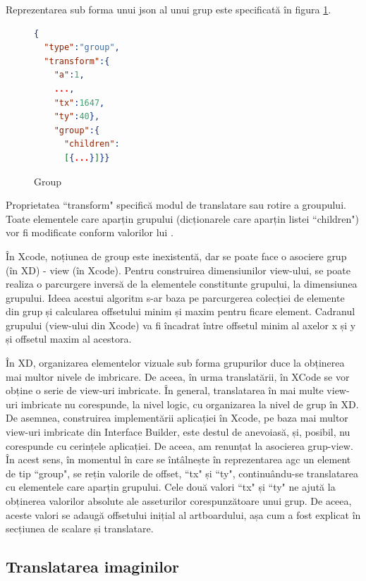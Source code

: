 Reprezentarea sub forma unui json al unui grup este specificată în figura \ref{fig:Group}. 

\begin{figure}[!htbp]
\begin{lstlisting}[language=json,firstnumber=1]
{
  "type":"group",
  "transform":{
    "a":1,
    ...,
    "tx":1647,
    "ty":40},
    "group":{
      "children":
      [{...}]}}
\end{lstlisting}
\caption{Group} \label{fig:Group}
\end{figure}

Proprietatea ``transform" specifică modul de translatare sau rotire a groupului. Toate elementele care aparțin grupului (dicționarele care aparțin listei ``children") vor fi modificate conform valorilor lui .

În Xcode, noțiunea de group este inexistentă, dar se poate face o asociere grup (în XD) - view (în Xcode).  
Pentru construirea dimensiunilor view-ului, se poate realiza o parcurgere inversă de la elementele constitunte grupului, la dimensiunea grupului. Ideea acestui algoritm s-ar baza pe parcurgerea colecției de elemente din grup și calcularea offsetului minim și maxim pentru ficare element. Cadranul grupului (view-ului din Xcode) va fi încadrat între offsetul minim al axelor x și y și offsetul maxim al acestora.

În XD, organizarea elementelor vizuale sub forma grupurilor duce la obținerea mai multor nivele de imbricare. De aceea, în urma translatării, în XCode se vor obține o serie de view-uri imbricate. În general, translatarea în mai multe view-uri imbricate nu corespunde, la nivel logic, cu organizarea la nivel de grup în XD. De asemnea, construirea implementării aplicației în Xcode, pe baza mai multor view-uri imbricate din Interface Builder, este destul de anevoiasă, și, posibil, nu corespunde cu cerințele aplicației. De aceea, am renunțat la asocierea grup-view. În acest sens, în momentul în care se întâlnește în reprezentarea agc un element de tip ``group", se rețin valorile de offset, ``tx" și ``ty", continuându-se translatarea cu elementele care aparțin grupului.  Cele două valori ``tx" și ``ty" ne ajută la obținerea valorilor absolute ale asseturilor corespunzătoare unui grup. De aceea, aceste valori se adaugă offsetului inițial al artboardului, așa cum a fost explicat în secțiunea de scalare și translatare.

\subsection{Translatarea imaginilor}

